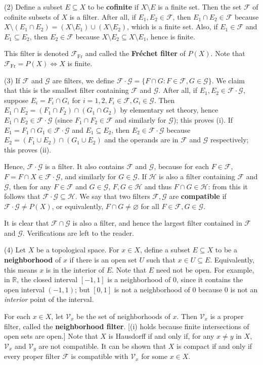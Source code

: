 \documentclass{article}
\def\F{\mathscr F}
\def\Frec{\mathscr F_{\mathrm{Fr}}}
\def\G{\mathscr G}
\def\H{\mathscr H}
\def\V{\mathscr V}
\def\R{\mathbb R}
\begin{document}
(2) Define a subset $E\subseteq X$ to be \textbf{cofinite} if $X\setminus E$ is a finite set.  Then the set $\F$ of cofinite subsets of $X$ is a filter.  After all, if $E_1,E_2\in\F$, then $E_1\cap E_2\in\F$ because $X\setminus(E_1\cap E_2)=(X\setminus E_1)\cup(X\setminus E_2)$, which is a finite set.  Also, if $E_1\in\F$ and $E_1\subseteq E_2$, then $E_2\in\F$ because $X\setminus E_2\subseteq X\setminus E_1$, hence is finite.

This filter is denoted $\Frec$ and called the \textbf{Fr\'echet filter} of $P(X)$.  Note that $\Frec=P(X)\iff X$ is finite.

(3) If $\F$ and $\G$ are filters, we define $\F\cdot\G=\{F\cap G:F\in\F,G\in\G\}$.  We claim that this is the smallest filter containing $\F$ and $\G$.  After all, if $E_1,E_2\in\F\cdot\G$, suppose $E_i=F_i\cap G_i$ for $i=1,2,F_i\in\F,G_i\in\G$.  Then $E_1\cap E_2=(F_1\cap F_2)\cap(G_1\cap G_2)$ by elementary set theory, hence $E_1\cap E_2\in\F\cdot\G$ (since $F_1\cap F_2\in\F$ and similarly for $\G$); this proves (i).  If $E_1=F_1\cap G_1\in\F\cdot\G$ and $E_1\subseteq E_2$, then $E_2\in\F\cdot\G$ because $E_2=(F_1\cup E_2)\cap(G_1\cup E_2)$ and the operands are in $\F$ and $\G$ respectively; this proves (ii).

Hence, $\F\cdot\G$ is a filter.  It also contains $\F$ and $\G$, because for each $F\in\F$, $F=F\cap X\in\F\cdot\G$, and similarly for $G\in\G$.  If $\H$ is also a filter containing $\F$ and $\G$, then for any $F\in\F$ and $G\in\G$, $F,G\in\H$ and thus $F\cap G\in\H$: from this it follows that $\F\cdot\G\subseteq\H$.  We say that two filters $\F,\G$ are \textbf{compatible} if $\F\cdot\G\ne P(X)$, or equivalently, $F\cap G\ne\varnothing$ for all $F\in\F,G\in\G$.

It is clear that $\F\cap\G$ is also a filter, and hence the largest filter contained in $\F$ and $\G$.  Verifications are left to the reader.

(4) Let $X$ be a topological space.  For $x\in X$, define a subset $E\subseteq X$ to be a \textbf{neighborhood} of $x$ if there is an open set $U$ such that $x\in U\subseteq E$.  Equivalently, this means $x$ is in the interior of $E$.  Note that $E$ need not be open.  For example, in $\R$, the closed interval $[-1,1]$ is a neighborhood of $0$, since it contains the open interval $(-1,1)$; but $[0,1]$ is not a neighborhood of $0$ because $0$ is not an \emph{interior} point of the interval.

For each $x\in X$, let $\V_x$ be the set of neighborhoods of $x$.  Then $\V_x$ is a proper filter, called the \textbf{neighborhood filter}.  [(i) holds because finite intersections of open sets are open.]  Note that $X$ is Hausdorff if and only if, for any $x\ne y$ in $X$, $\V_x$ and $\V_y$ are not compatible.  It can be shown that $X$ is compact if and only if every proper filter $\F$ is compatible with $\V_x$ for some $x\in X$.\\
\end{document}

